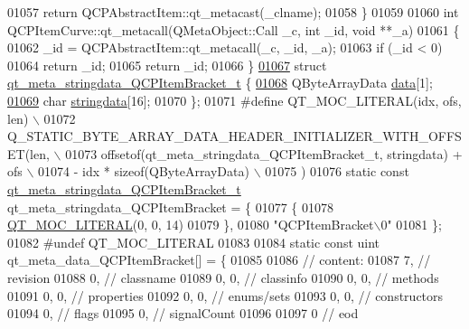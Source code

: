 \begin{DoxyCode}
01057     \textcolor{keywordflow}{return} QCPAbstractItem::qt\_metacast(\_clname);
01058 \}
01059 
01060 \textcolor{keywordtype}{int} QCPItemCurve::qt\_metacall(QMetaObject::Call \_c, \textcolor{keywordtype}{int} \_id, \textcolor{keywordtype}{void} **\_a)
01061 \{
01062     \_id = QCPAbstractItem::qt\_metacall(\_c, \_id, \_a);
01063     \textcolor{keywordflow}{if} (\_id < 0)
01064         \textcolor{keywordflow}{return} \_id;
01065     \textcolor{keywordflow}{return} \_id;
01066 \}
\hypertarget{a00067_source_l01067}{}\hyperlink{a00067}{01067} \textcolor{keyword}{struct }\hyperlink{a00067_d7/da0/a00198}{qt\_meta\_stringdata\_QCPItemBracket\_t} \{
\hypertarget{a00067_source_l01068}{}\hyperlink{a00067_a15ff7a0bed3ecf746215a57a076c296b}{01068}     QByteArrayData \hyperlink{a00067_a15ff7a0bed3ecf746215a57a076c296b}{data}[1];
\hypertarget{a00067_source_l01069}{}\hyperlink{a00067_a2e0cf4afc3bc921fbe6f35930bfbd9af}{01069}     \textcolor{keywordtype}{char} \hyperlink{a00067_a2e0cf4afc3bc921fbe6f35930bfbd9af}{stringdata}[16];
01070 \};
01071 \textcolor{preprocessor}{#define QT\_MOC\_LITERAL(idx, ofs, len) \(\backslash\)}
01072 \textcolor{preprocessor}{    Q\_STATIC\_BYTE\_ARRAY\_DATA\_HEADER\_INITIALIZER\_WITH\_OFFSET(len, \(\backslash\)}
01073 \textcolor{preprocessor}{    offsetof(qt\_meta\_stringdata\_QCPItemBracket\_t, stringdata) + ofs \(\backslash\)}
01074 \textcolor{preprocessor}{        - idx * sizeof(QByteArrayData) \(\backslash\)}
01075 \textcolor{preprocessor}{    )}
01076 \textcolor{keyword}{static} \textcolor{keyword}{const} \hyperlink{a00067_d7/da0/a00198}{qt\_meta\_stringdata\_QCPItemBracket\_t} 
      qt\_meta\_stringdata\_QCPItemBracket = \{
01077     \{
01078 \hyperlink{a00067_a75bb9482d242cde0a06c9dbdc6b83abe}{QT\_MOC\_LITERAL}(0, 0, 14)
01079     \},
01080     \textcolor{stringliteral}{"QCPItemBracket\(\backslash\)0"}
01081 \};
01082 \textcolor{preprocessor}{#undef QT\_MOC\_LITERAL}
01083 
01084 \textcolor{keyword}{static} \textcolor{keyword}{const} uint qt\_meta\_data\_QCPItemBracket[] = \{
01085 
01086  \textcolor{comment}{// content:}
01087        7,       \textcolor{comment}{// revision}
01088        0,       \textcolor{comment}{// classname}
01089        0,    0, \textcolor{comment}{// classinfo}
01090        0,    0, \textcolor{comment}{// methods}
01091        0,    0, \textcolor{comment}{// properties}
01092        0,    0, \textcolor{comment}{// enums/sets}
01093        0,    0, \textcolor{comment}{// constructors}
01094        0,       \textcolor{comment}{// flags}
01095        0,       \textcolor{comment}{// signalCount}
01096 
01097        0        \textcolor{comment}{// eod}

\end{DoxyCode}
